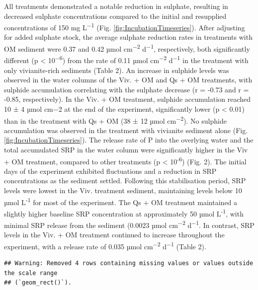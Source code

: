 \documentclass[12pt,twoside]{book}
\begin{document}
All treatments demonstrated a notable reduction in sulphate, resulting in decreased sulphate concentrations compared to the initial and resupplied concentrations of 150 mg L\textsuperscript{−1} (Fig. \ref{fig:IncubationTimeseries}). After adjusting for added sulphate stock, the average sulphate reduction rates in treatments with OM sediment were 0.37 and 0.42 µmol cm\textsuperscript{−2} d\textsuperscript{−1}, respectively, both significantly different (p \textless{} 10\textsuperscript{−6}) from the rate of 0.11 µmol cm\textsuperscript{−2} d\textsuperscript{−1} in the treatment with only vivianite-rich sediments (Table 2). An increase in sulphide levels was observed in the water columns of the Viv. + OM and Qs + OM treatments, with sulphide accumulation correlating with the sulphate decrease (r = -0.73 and r = -0.85, respectively). In the Viv. + OM treatment, sulphide accumulation reached 10 ± 4 µmol cm−2 at the end of the experiment, significantly lower (p \textless{} 0.01) than in the treatment with Qs + OM (38 ± 12 µmol cm\textsuperscript{−2}). No sulphide accumulation was observed in the treatment with vivianite sediment alone (Fig. \ref{fig:IncubationTimeseries}).
The release rate of P into the overlying water and the total accumulated SRP in the water column were significantly higher in the Viv + OM treatment, compared to other treatments (p \textless{} 10\textsuperscript{-6}) (Fig. 2). The initial days of the experiment exhibited fluctuations and a reduction in SRP concentrations as the sediment settled. Following this stabilisation period, SRP levels were lowest in the Viv. treatment sediment, maintaining levels below 10 µmol L\textsuperscript{-1} for most of the experiment. The Qs + OM treatment maintained a slightly higher baseline SRP concentration at approximately 50 µmol L\textsuperscript{-1}, with minimal SRP release from the sediment (0.0023 µmol cm\textsuperscript{−2} d\textsuperscript{−1}. In contrast, SRP levels in the Viv. + OM treatment continued to increase throughout the experiment, with a release rate of 0.035 µmol cm\textsuperscript{−2} d\textsuperscript{−1} (Table 2).

\begin{verbatim}
## Warning: Removed 4 rows containing missing values or values outside the scale range
## (`geom_rect()`).
\end{verbatim}
\end{document}
